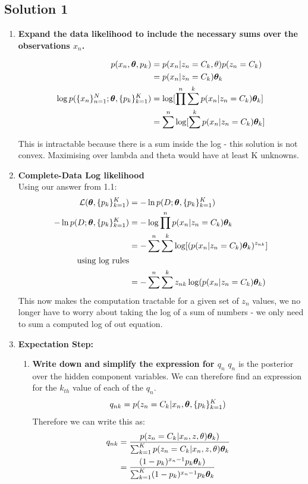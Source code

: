 \documentclass[submit]{harvardml}
\begin{document}
\subsection*{Solution 1}

\begin{enumerate}
    \item \textbf{Expand the data likelihood to include the necessary sums over the observations $x_n$.}
    
    \begin{align*}
        p(x_n, \boldsymbol{\theta}, p_k) &= p(x_n | z_n = C_k, \theta) p(z_n = C_k) \\
        &= p(x_n | z_n = C_k) \boldsymbol{\theta}_k \\
        \log p(\{x_n\}^N_{n=1}; \boldsymbol{\theta}, \{p_k\}^K_{k = 1}) &= \log [\prod^n \sum^k p(x_n| z_n = C_k) \boldsymbol{\theta}_k]\\
        &=  \sum^n  \log [ \sum^k p(x_n| z_n = C_k) \boldsymbol{\theta}_k]
    \end{align*}
    
    This is intractable because there is a sum inside the log - this solution is not convex. Maximising over lambda and theta would have at least K unknowns. 
    
    \item \textbf{Complete-Data Log likelihood}\\
    Using our answer from 1.1:
    \begin{align*}
        \mathcal{L}(\boldsymbol{\theta}, \{p_k\}^K_{k=1}) &=  -\ln p(D; \boldsymbol{\theta}, \{p_k\}^K_{k=1}) \\
        -\ln p(D; \boldsymbol{\theta}, \{p_k\}^K_{k=1}) &= -\log \prod^n p(x_n| z_n = C_k) \boldsymbol{\theta}_k \\
        &= - \sum^n \sum^k \log [  ( p(x_n| z_n = C_k) \boldsymbol{\theta}_k)^{z_{nk}} ] \\
        \text{using log rules}\\
        &= - \sum^n \sum^k z_{nk} \log  ( p(x_n| z_n = C_k) \boldsymbol{\theta}_k)\\
    \end{align*}
    This now makes the computation tractable for a given set of $z_n$ values, we no longer have to worry about taking the log of a sum of numbers - we only need to sum a computed log of out equation.
    
    \item \textbf{Expectation Step:}
    \begin{enumerate}
        \item \textbf{Write down and simplify the expression for $q_n$}
        $q_n$ is the posterior over the hidden component variables. We can therefore find an expression for the $k_{th}$ value of each of the $q_n$.
        $$
            q_{nk} = p(z_n = C_k | x_n, \boldsymbol{\theta}, \{p_k\}^K_{k=1})
        $$
        Therefore we can write this as:
        \begin{align*}
            q_{nk} &= \frac{p(z_n = C_k | x_n, z, \theta)\boldsymbol{\theta}_k) }{\sum^K_{k=1} p(z_n = C_k | x_n, z, \theta)\boldsymbol{\theta}_k}\\
            &= \frac{(1 - p_k)^{x_n - 1} p_k\boldsymbol{\theta}_k) }{\sum^K_{k=1} (1 - p_k)^{x_n - 1} p_k\boldsymbol{\theta}_k}
        \end{align*}
        

\end{enumerate}
\end{enumerate}
\end{document}
